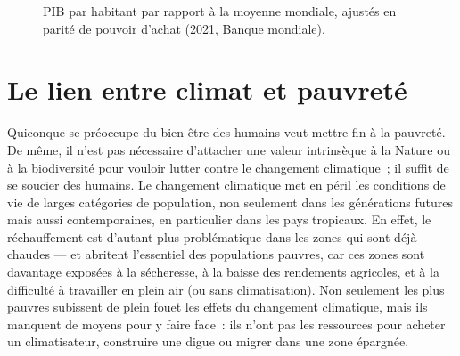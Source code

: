 \documentclass[a5paper,french]{memoir}
\begin{document}
\begin{figure}[h!]
  \caption{PIB par habitant par rapport à la moyenne mondiale, ajustés en parité de pouvoir d'achat (2021, Banque mondiale). %
  }\label{fig:GDPpc}
\end{figure}

\section{Le lien entre climat et pauvreté} %

Quiconque se préoccupe du bien-être des humains veut mettre fin à la pauvreté. 
De même, il n'est pas nécessaire d'attacher une valeur intrinsèque à la Nature ou à la biodiversité pour vouloir lutter contre le changement climatique~; il suffit de se soucier des humains. Le changement climatique met en péril les conditions de vie de larges catégories de population, non seulement dans les générations futures mais aussi contemporaines, en particulier dans les pays tropicaux. En effet, le réchauffement est d'autant plus problématique dans les zones qui sont déjà chaudes --- et abritent l'essentiel des populations pauvres, car ces zones sont davantage exposées à la sécheresse, à la baisse des rendements agricoles, et à la difficulté à travailler en plein air (ou sans climatisation). Non seulement les plus pauvres subissent de plein fouet les effets du changement climatique, mais ils manquent de moyens pour y faire face~: %
ils n'ont pas les ressources pour acheter un climatisateur, construire une digue ou migrer dans une zone épargnée. 

\end{document}
